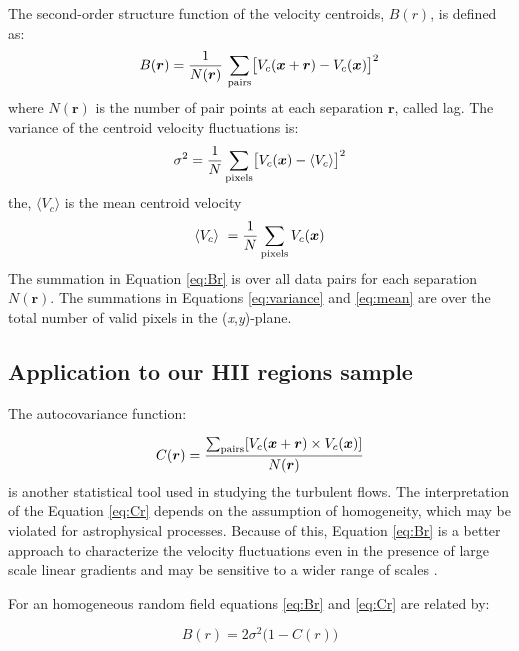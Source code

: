 \documentclass[fleqn,usenatbib, useAMS, a4paper]{mnras}
\begin{document}
The second-order structure function of the velocity centroids, $B(r)$, is defined as:
%
\begin{equation}\label{eq:Br}
  B(\boldsymbol{r}) = \dfrac{1}{N(\boldsymbol{r})}
  \,
  \sum_{\text{pairs}} \bigl[
  V_{c}(\boldsymbol{x} + \boldsymbol{r}) - V_{c}(\boldsymbol{x})
  \bigr]^{2}
\end{equation}
%
where $N(\boldsymbol{r})$ is the number of pair points at each separation \(\boldsymbol{r}\), called lag. 
The variance of the centroid velocity fluctuations is:
%
\begin{equation}\label{eq:variance}
\sigma^2  = \frac{1}{N} \sum_{\text{pixels}} \bigl[ V_c (\boldsymbol{x}) -\langle V_ c\rangle  \bigr]^2
\end{equation}
%
the, \(\langle V_c \rangle \) is the mean centroid velocity
%
\begin{equation}\label{eq:mean}
\langle V_c \rangle \  = \frac{1}{N} \sum_{\text{pixels}} V_c (\boldsymbol{x})
\end{equation}
%
The summation in Equation \ref{eq:Br} is over all data pairs for each separation \(N(\boldsymbol{r})\).
The summations in Equations \ref{eq:variance} and \ref{eq:mean} are over the total number of valid pixels in the (\textit{x},\textit{y})-plane.

\subsection{Application to our HII regions sample}\label{sec:methods-apply}

The autocovariance function:

\begin{equation}\label{eq:Cr}
C(\boldsymbol{r}) = \dfrac{\sum_{\text{pairs}}[V_{c}(\boldsymbol{x} + \boldsymbol{r}) \times V_{c}(\boldsymbol{x}) ]} {N(\boldsymbol{r})}
\end{equation}
%
is another statistical tool used in studying the turbulent flows.
The interpretation of the Equation \ref{eq:Cr} depends on the assumption of homogeneity, which may be violated for astrophysical processes.
Because of this, Equation \ref{eq:Br} is a better approach to characterize the velocity fluctuations even in the presence of large scale linear gradients and may be sensitive to a wider range of scales \citep{1984ApJ...277..556S}.

For an homogeneous random field equations \ref{eq:Br} and \ref{eq:Cr} are related by:

\begin{equation}\label{eq:functional}
B(r) = 2\sigma^2 \bigl( 1 - C(r) \bigr)
\end{equation}
\end{document}
